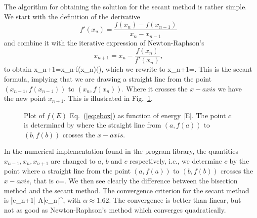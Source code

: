 The algorithm for obtaining the solution 
for the secant method is rather simple. We start with the definition
of the derivative
\[
   f'(x_n)=\frac{f(x_n)-f(x_{n-1})}{x_n-x_{n-1}}
\]
and combine it with the iterative expression of Newton-Raphson's 
\[
   x_{n+1}=x_n-\frac{f(x_n)}{f'(x_n)},
\]
to obtain 
\be
   x_{n+1}=x_n-f(x_n)\left(\right),
\ee
which we rewrite to
\be
   x_{n+1}=.
\ee
This is the secant formula, implying that we are drawing a straight line
from the point $(x_{n-1},f(x_{n-1}))$ to $(x_n,f(x_n))$. Where
it crosses the $x-axis$ we have the new point $x_{n+1}$. 
This is illustrated in Fig.\  \ref{fig:chap8fig2}.
\begin{figure}
   
   \caption{Plot of $f(E)$ Eq.\ (\ref{eq:ebox}) as function of energy |E|. 
            The point  
            $c$ is determined by where the straight line from $(a,f(a))$ 
            to $(b,f(b))$ crosses the $x-axis$.}
   \label{fig:chap8fig2}
\end{figure}

In the numerical implementation found in the program library, the 
quantities $x_{n-1}, x_n, x_{n+1}$ are changed to 
$a$, $b$ and $c$ respectively, i.e.,
we determine $c$ by the point where a straight line
from the point $(a,f(a))$ to $(b,f(b))$ crosses the $x-axis$, that is
\be
   c=.
\ee
We then see clearly the difference between the bisection method and the 
secant method. The convergence criterion for the secant method is
\be
   |e_{n+1}| \approx A|e_n|^{\alpha},
\ee
with $\alpha\approx 1.62$. The convergence is better than linear, but not as
good as Newton-Raphson's method which converges quadratically. 


